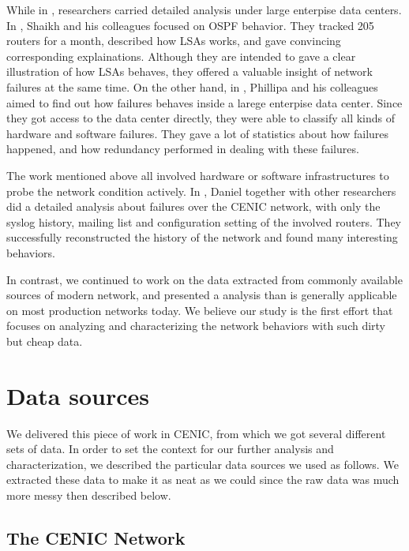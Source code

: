 \documentclass[conference, twocolumn, oneside, 10pt]{IEEEtran}
\begin{document}
While in \cite{Shaikh:2002:CSO:637201.637236, Gill:2011:UNF:2018436.2018477}, researchers carried detailed analysis under large enterpise data centers. In \cite{Shaikh:2002:CSO:637201.637236}, Shaikh and his colleagues focused on OSPF behavior. They tracked 205 routers for a month, described how LSAs works, and gave convincing corresponding explainations. Although they are intended to gave a clear illustration of how LSAs behaves, they offered a valuable insight of network failures at the same time. On the other hand, in \cite{Gill:2011:UNF:2018436.2018477}, Phillipa and his colleagues aimed to find out how failures behaves inside a larege enterpise data center. Since they got access to the data center directly, they were able to classify all kinds of hardware and software failures. They gave a lot of statistics about how failures happened, and how redundancy performed in dealing with these failures. 

The work mentioned above all involved hardware or software infrastructures to probe the network condition actively. In \cite{turner2010california}, Daniel together with other researchers did a detailed analysis about failures over the CENIC network, with only the syslog history, mailing list and configuration setting of the involved routers. They successfully reconstructed the history of the network and found many interesting behaviors.

In contrast, we continued to work on the data extracted from commonly available sources of modern network, and presented a analysis than is generally applicable on most production networks today. We believe our study is the first effort that focuses on analyzing and characterizing the network behaviors with such dirty but cheap data.

\section{Data sources}
\label{sec:sec3}

We delivered this piece of work in CENIC, from which we got several different sets of data. In order to set the context for our further analysis and characterization, we described the particular data sources we used as follows. We extracted these data to make it as neat as we could since the raw data was much more messy then described below.

\subsection{The CENIC Network}
\end{document}
